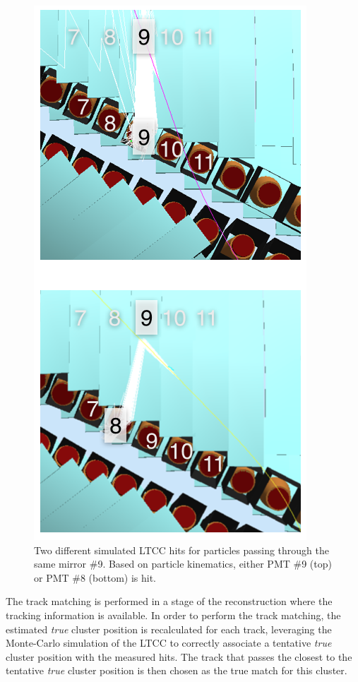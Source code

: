\begin{figure}
  \centering
  \includegraphics[width=0.95\columnwidth,keepaspectratio]{img/trackmatching.png}
  \caption{Two different simulated LTCC hits for particles passing through the same mirror
  \#9. Based on particle kinematics, either PMT \#9 (top) or PMT \#8 (bottom) is hit.}
  \label{fig:trackmatching}
\end{figure}

The track matching is performed in a stage of the reconstruction where the tracking
information is available. In order to perform the track matching, the estimated
\textit{true} cluster position is recalculated for each track, leveraging the Monte-Carlo
simulation of the LTCC to correctly associate a tentative \textit{true} cluster position
with the measured hits.
The track that passes the closest to the tentative \textit{true} cluster position is
then chosen as the true match for this cluster.
